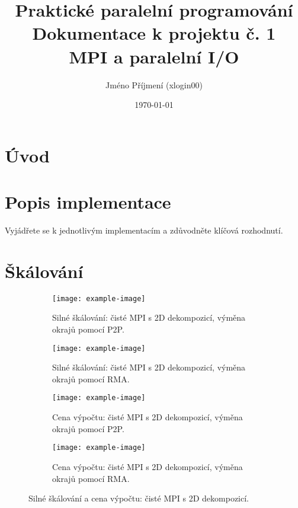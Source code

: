 \documentclass{article}
\title{Praktické paralelní programování\\Dokumentace k projektu č. 1\\MPI a paralelní I/O}
\author{Jméno Příjmení (xlogin00)}
\date{\today}
\begin{document}
\maketitle

\section{Úvod}
\label{sec:uvod}

\section{Popis implementace}
\label{sec:implementace}
Vyjádřete se k jednotlivým implementacím a zdůvodněte klíčová rozhodnutí. 

\section{Škálování}
\label{sec:skalovani}

\begin{figure}[H]
    \centering
    \begin{subfigure}{0.45\textwidth}
        \centering
        \texttt{[image: example-image]}
        \caption{Silné škálování: čisté MPI s 2D dekompozicí, výměna okrajů pomocí P2P.}
        \label{fig:2D_MPI_P2P}
    \end{subfigure}
    \hfill
    \begin{subfigure}{0.45\textwidth}
        \centering
        \texttt{[image: example-image]}
        \caption{Silné škálování: čisté MPI s 2D dekompozicí, výměna okrajů pomocí RMA.}
        \label{fig:2D_MPI_RMA}
    \end{subfigure}

    \begin{subfigure}{0.45\textwidth}
        \centering
        \texttt{[image: example-image]}
        \caption{Cena výpočtu: čisté MPI s 2D dekompozicí, výměna okrajů pomocí P2P.}
        \label{fig:2D_MPI_P2P}
    \end{subfigure}
    \hfill
    \begin{subfigure}{0.45\textwidth}
        \centering
        \texttt{[image: example-image]}
        \caption{Cena výpočtu: čisté MPI s 2D dekompozicí, výměna okrajů pomocí RMA.}
        \label{fig:2D_MPI_RMA}
    \end{subfigure}
    \caption{Silné škálování a cena výpočtu: čisté MPI s 2D dekompozicí.}
    \label{fig:2D_MPI}
\end{figure}
\end{document}
